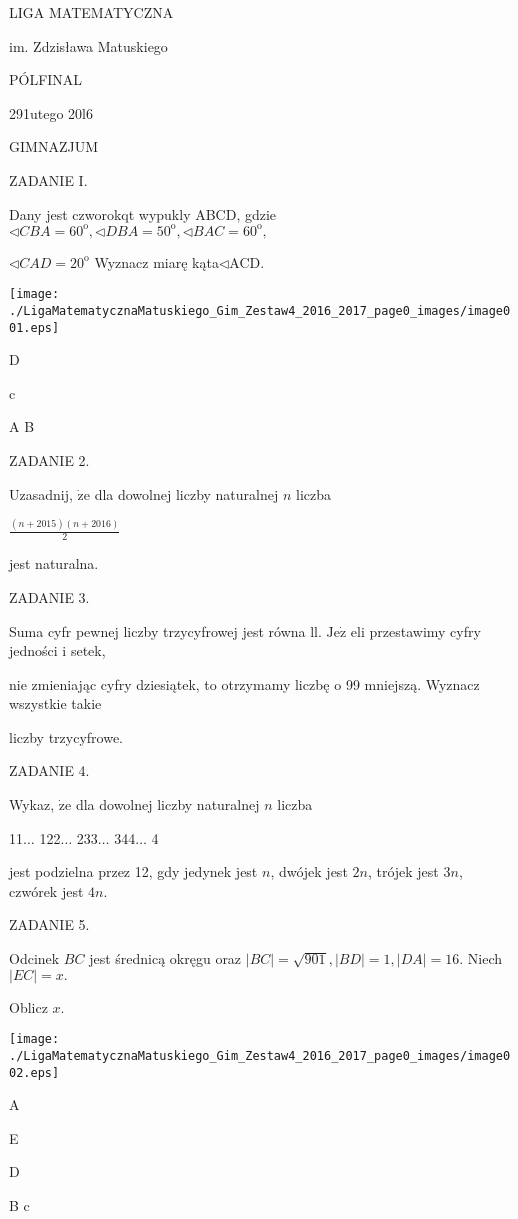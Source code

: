 \documentclass[a4paper,12pt]{article}
\begin{document}
LIGA MATEMATYCZNA

im. Zdzisława Matuskiego

PÓLFINAL

291utego 20l6

GIMNAZJUM

ZADANIE I.

Dany jest czworokqt wypukly ABCD, gdzie $\triangleleft CBA = 60^{\mathrm{o}}, \triangleleft DBA = 50^{\mathrm{o}}, \triangleleft BAC = 60^{\mathrm{o}},$

$\triangleleft CAD=20^{\mathrm{o}}$ Wyznacz miarę kąta$\triangleleft$ACD.
\begin{center}
\texttt{[image: ./LigaMatematycznaMatuskiego\_Gim\_Zestaw4\_2016\_2017\_page0\_images/image001.eps]}
\end{center}
D

c

A  B

ZADANIE 2.

Uzasadnij, $\dot{\mathrm{z}}\mathrm{e}$ dla dowolnej liczby naturalnej $n$ liczba

$\displaystyle \frac{(n+2015)(n+2016)}{2}$

jest naturalna.

ZADANIE 3.

Suma cyfr pewnej liczby trzycyfrowej jest równa ll. $\mathrm{J}\mathrm{e}\dot{\mathrm{z}}$ eli przestawimy cyfry jedności i setek,

nie zmieniając cyfry dziesiątek, to otrzymamy liczbę o 99 mniejszą. Wyznacz wszystkie takie

liczby trzycyfrowe.

ZADANIE 4.

Wykaz, $\dot{\mathrm{z}}\mathrm{e}$ dla dowolnej liczby naturalnej $n$ liczba

11$\ldots$ 122$\ldots$ 233$\ldots$ 344$\ldots$ 4

jest podzielna przez 12, gdy jedynek jest $n$, dwójek jest $2n$, trójek jest $3n$, czwórek jest $4n.$

ZADANIE 5.

Odcinek $BC$ jest średnicą okręgu oraz $|BC|=\sqrt{901}, |BD|=1, |DA|=16$. Niech $|EC|=x.$

Oblicz $x.$
\begin{center}
\texttt{[image: ./LigaMatematycznaMatuskiego\_Gim\_Zestaw4\_2016\_2017\_page0\_images/image002.eps]}
\end{center}
A

E

D

B c
\end{document}
